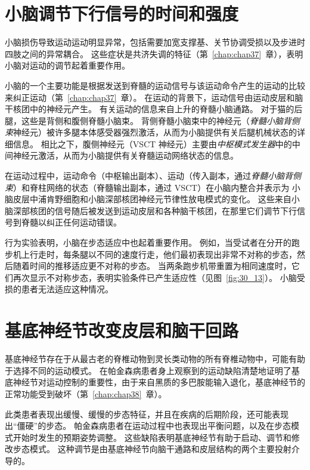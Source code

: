 \section{小脑调节下行信号的时间和强度}

小脑损伤导致运动运动明显异常，包括需要加宽支撑基、关节协调受损以及步进时四肢之间的异常耦合。
这些症状是共济失调的特征（第~\ref{chap:chap37}~章），表明小脑对运动的调节起着重要作用。


小脑的一个主要功能是根据发送到脊髓的运动信号与该运动命令产生的运动的比较来纠正运动（第~\ref{chap:chap37}~章）。
在运动的背景下，运动信号由运动皮层和脑干核团中的神经元产生。
有关运动的信息来自上升的脊髓小脑通路。
对于猫的后腿，这些是背侧和腹侧脊髓小脑束。
背侧脊髓小脑束中的神经元（\textit{脊髓小脑背侧束}神经元）被许多腿本体感受器强烈激活，从而为小脑提供有关后腿机械状态的详细信息。
相比之下，腹侧神经元（VSCT 神经元）主要由\textit{中枢模式发生器}中的中间神经元激活，从而为小脑提供有关脊髓运动网络状态的信息。


在运动过程中，运动命令（中枢输出副本）、运动（传入副本，通过\textit{脊髓小脑背侧束}）和脊柱网络的状态（脊髓输出副本，通过 VSCT）在小脑内整合并表示为 小脑皮层中浦肯野细胞和小脑深部核团神经元节律性放电模式的变化。
这些来自小脑深部核团的信号随后被发送到运动皮层和各种脑干核团，在那里它们调节下行信号到脊髓以纠正任何运动错误。


行为实验表明，小脑在步态适应中也起着重要作用。
例如，当受试者在分开的跑步机上行走时，每条腿以不同的速度行走，他们最初表现出非常不对称的步态，然后随着时间的推移适应更不对称的步态。
当两条跑步机带重置为相同速度时，它们再次显示不对称步态，表明实验条件已产生适应性（见图~\ref{fig:30_13}）。
小脑受损的患者无法适应这种情况。



\section{基底神经节改变皮层和脑干回路}

基底神经节存在于从最古老的脊椎动物到灵长类动物的所有脊椎动物中，可能有助于选择不同的运动模式。
在帕金森病患者身上观察到的运动缺陷清楚地证明了基底神经节对运动控制的重要性，由于来自黑质的多巴胺能输入退化，基底神经节的正常功能受到破坏（第~\ref{chap:chap38}~章）。


此类患者表现出缓慢、缓慢的步态特征，并且在疾病的后期阶段，还可能表现出“僵硬”的步态。
帕金森病患者在运动过程中也表现出平衡问题，以及在步态模式开始时发生的预期姿势调整。
这些缺陷表明基底神经节有助于启动、调节和修改步态模式。
这种调节是由基底神经节向脑干通路和皮层结构的两个主要投射介导的。


